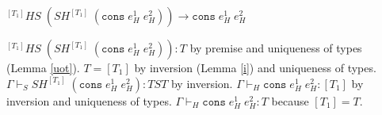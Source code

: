 \begin{case}
$^{[T_{1}]}HS\;(SH^{[T_{1}]}\;(\mathtt{cons}\;e_{H}^{1}\;e_{H}^{2}))\rightarrow\mathtt{cons}\;e_{H}^{1}\;e_{H}^{2}$

$^{[T_{1}]}HS\;(SH^{[T_{1}]}\;(\mathtt{cons}\;e_{H}^{1}\;e_{H}^{2})):T$ by premise and uniqueness of types (Lemma \ref{uot}).  $T=[T_{1}]$ by inversion (Lemma \ref{i}) and uniqueness of types.  $\Gamma\vdash_{S}SH^{[T_{1}]}\;(\mathtt{cons}\;e_{H}^{1}\;e_{H}^{2}):TST$ by inversion.  $\Gamma\vdash_{H}\mathtt{cons}\;e_{H}^{1}\;e_{H}^{2}:[T_{1}]$ by inversion and uniqueness of types.  $\Gamma\vdash_{H}\mathtt{cons}\;e_{H}^{1}\;e_{H}^{2}:T$ because $[T_{1}]=T$.
\end{case}
